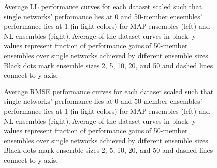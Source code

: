 \documentclass[../thesis.tex]{subfiles}
\begin{document}
\begin{figure}
    \centering
    \begin{subfigure}{0.49\textwidth}
        \setlength{\figwidth}{.99\textwidth}
        \setlength{\figheight}{.33\textheight}
        
        \label{fig:uci-ensemble-sizes-ll-map}
    \end{subfigure}
    \begin{subfigure}{0.49\textwidth}
        \setlength{\figwidth}{.99\textwidth}
        \setlength{\figheight}{.33\textheight}
        
        \label{fig:uci-ensemble-sizes-ll-llb}
    \end{subfigure}
    \caption{Average LL performance curves for each dataset scaled such that single networks' performance lies at 0 and 50-member ensembles' performance lies at 1 (in light colors) for MAP ensembles (left) and NL ensembles (right). Average of the dataset curves in black. y-values represent fraction of performance gains of 50-member ensembles over single networks achieved by different ensemble sizes. Black dots mark ensemble sizes 2, 5, 10, 20, and 50 and dashed lines connect to y-axis.}
    \label{fig:uci-ensemble-sizes-ll}
\end{figure}

\begin{figure}
    \centering
    \begin{subfigure}{0.49\textwidth}
        \setlength{\figwidth}{.99\textwidth}
        \setlength{\figheight}{.33\textheight}
        
        \label{fig:uci-ensemble-sizes-rmse-map}
    \end{subfigure}
    \begin{subfigure}{0.49\textwidth}
        \setlength{\figwidth}{.99\textwidth}
        \setlength{\figheight}{.33\textheight}
        
        \label{fig:uci-ensemble-sizes-rmse-llb}
    \end{subfigure}
    \caption{Average RMSE performance curves for each dataset scaled such that single networks' performance lies at 0 and 50-member ensembles' performance lies at 1 (in light colors) for MAP ensembles (left) and NL ensembles (right). Average of the dataset curves in black. y-values represent fraction of performance gains of 50-member ensembles over single networks achieved by different ensemble sizes. Black dots mark ensemble sizes 2, 5, 10, 20, and 50 and dashed lines connect to y-axis.}
    \label{fig:uci-ensemble-sizes-rmse}
\end{figure}
\end{document}
